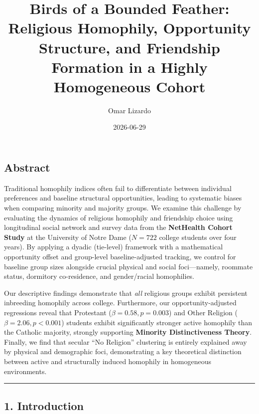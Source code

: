 \documentclass[
  letterpaper,
  DIV=11,
  numbers=noendperiod]{scrartcl}
\title{Birds of a Bounded Feather: Religious Homophily, Opportunity
Structure, and Friendship Formation in a Highly Homogeneous Cohort}
\author{Omar Lizardo}
\date{2026-06-29}
\begin{document}
\maketitle


\subsection{Abstract}\label{abstract}

Traditional homophily indices often fail to differentiate between
individual preferences and baseline structural opportunities, leading to
systematic biases when comparing minority and majority groups. We
examine this challenge by evaluating the dynamics of religious homophily
and friendship choice using longitudinal social network and survey data
from the \textbf{NetHealth Cohort Study} at the University of Notre Dame
(\(N = 722\) college students over four years). By applying a dyadic
(tie-level) framework with a mathematical opportunity offset and
group-level baseline-adjusted tracking, we control for baseline group
sizes alongside crucial physical and social foci---namely, roommate
status, dormitory co-residence, and gender/racial homophilies.

Our descriptive findings demonstrate that \emph{all} religious groups
exhibit persistent inbreeding homophily across college. Furthermore, our
opportunity-adjusted regressions reveal that Protestant
(\(\beta = 0.58, p = 0.003\)) and Other Religion
(\(\beta = 2.06, p < 0.001\)) students exhibit significantly stronger
active homophily than the Catholic majority, strongly supporting
\textbf{Minority Distinctiveness Theory}. Finally, we find that secular
``No Religion'' clustering is entirely explained away by physical and
demographic foci, demonstrating a key theoretical distinction between
active and structurally induced homophily in homogeneous environments.

\begin{center}\rule{0.5\linewidth}{0.5pt}\end{center}

\subsection{1. Introduction}\label{introduction}
\end{document}
